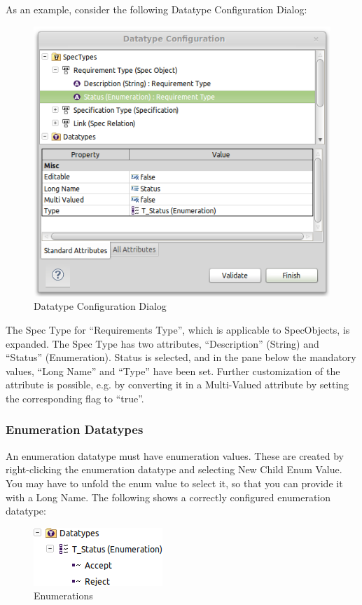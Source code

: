 {{{As an example, consider the following Datatype Configuration Dialog:

\begin{figure}[h!]
\centering     
\includegraphics[width=0.8\linewidth]{../rmf-images/pror_datatype_configuration.png}
\caption{Datatype Configuration Dialog}      
\label{fig:DatatypeConfig}
\end{figure}

The Spec Type for ``Requirements Type'', which is applicable to
SpecObjects, is expanded.  The Spec Type has two attributes,
``Description'' (String) and ``Status'' (Enumeration).  Status is
selected, and in the pane below the mandatory values, ``Long Name'' and
``Type'' have been set.  Further customization of the attribute is
possible, e.g.  by converting it in a Multi-Valued attribute by setting
the corresponding flag to ``true''.

\subsubsection{Enumeration Datatypes}

An enumeration datatype must have enumeration values.  These are created
by right-clicking the enumeration datatype and selecting New Child
\textbar{} Enum Value.  You may have to unfold the enum value to select
it, so that you can provide it with a Long Name.  The following shows a
correctly configured enumeration datatype:

\begin{figure}[h!]
\centering      
\includegraphics[width=0.4\linewidth]{../rmf-images/rmf_enumeration.png}
\caption{Enumerations}      
\label{fig:Enumerations}
\end{figure}

}}}

